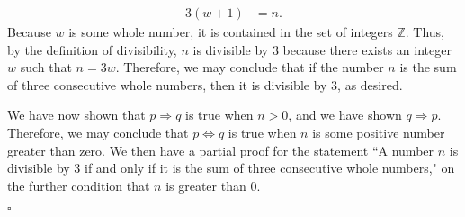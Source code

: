 \documentclass[12pt]{exam}
\begin{document}
\begin{questions}
\begin{align*}
3(w+1) &= n.
 \end{align*}
 Because $w$ is some whole number, it is contained in the set of integers $\mathbb Z$. Thus, by the definition of divisibility, $n$ is divisible by $3$ because there exists an integer $w$ such that $n = 3w$. Therefore, we may conclude that if the number $n$ is the sum of three consecutive whole numbers, then it is divisible by 3, as desired.
 \par
 We have now shown that $p \Rightarrow q$ is true when $n>0$, and we have shown $q \Rightarrow p$. Therefore, we may conclude that $p \Leftrightarrow q$ is true when $n$ is some positive number greater than zero. We then have a partial proof for the statement ``A number $n$ is divisible by 3 if and only if it is the sum of three consecutive whole numbers," on the further condition that $n$ is greater than $0$.
\begin{flushright}
$\square$
\end{flushright}


\end{questions}
\end{document}
